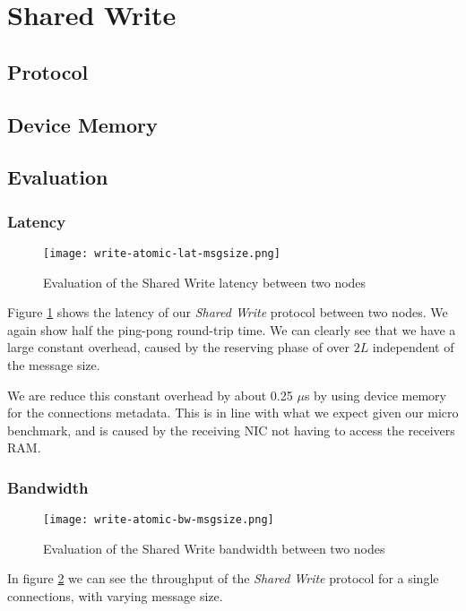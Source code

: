 \section{Shared Write} \label{sec:conn:shared_write}
\subsection{Protocol}
\subsection{Device Memory}
\subsection{Evaluation}

\subsubsection{Latency}

\begin{figure}[h]
\texttt{[image: write-atomic-lat-msgsize.png]}
\caption{Evaluation of the Shared Write latency between two nodes}
\label{fig:plot-write-atomic-lat}
\end{figure}

Figure \ref{fig:plot-write-atomic-lat} shows the latency of our \emph{Shared Write} protocol between two nodes. 
We again show half the ping-pong round-trip time. We can clearly see that we have a large constant overhead, caused
by the reserving phase of over $2L$ independent of the message size.

We are reduce this constant overhead by about 0.25 $\mu$s by using device memory for the connections metadata. This is 
in line with what we expect given our micro benchmark, and is caused by the receiving NIC not having to access the 
receivers RAM.


\subsubsection{Bandwidth}

\begin{figure}[h]
\texttt{[image: write-atomic-bw-msgsize.png]}
\caption{Evaluation of the Shared Write bandwidth between two nodes}
\label{fig:plot-write-atomic-bw}
\end{figure}

In figure \ref{fig:plot-write-atomic-bw} we can see the throughput of the \emph{Shared Write} protocol for a single 
connections, with varying message size. 

